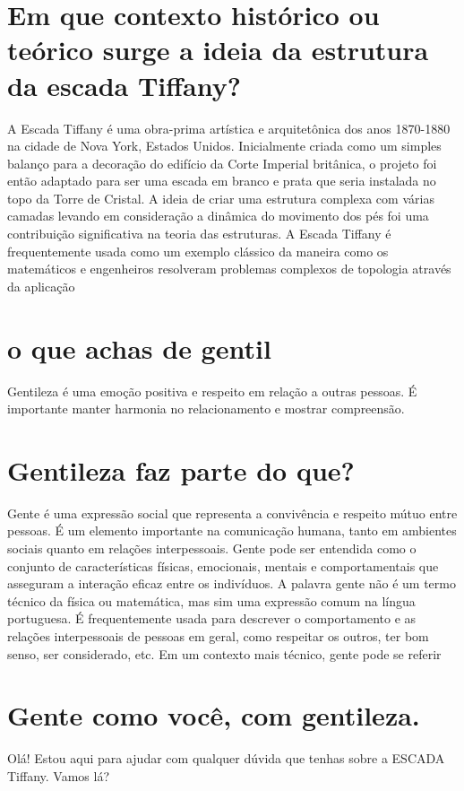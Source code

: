 \documentclass[11pt,a4paper]{article}
\begin{document}
\section{Em que contexto histórico ou teórico surge a ideia da estrutura da escada Tiffany?}
A Escada Tiffany é uma obra-prima artística e arquitetônica dos anos 1870-1880 na cidade de Nova York, Estados Unidos. Inicialmente criada como um simples balanço para a decoração do edifício da Corte Imperial britânica, o projeto foi então adaptado para ser uma escada em branco e prata que seria instalada no topo da Torre de Cristal. A ideia de criar uma estrutura complexa com várias camadas levando em consideração a dinâmica do movimento dos pés foi uma contribuição significativa na teoria das estruturas. A Escada Tiffany é frequentemente usada como um exemplo clássico da maneira como os matemáticos e engenheiros resolveram problemas complexos de topologia através da aplicação

\section{o que achas de gentil}
Gentileza é uma emoção positiva e respeito em relação a outras pessoas. É importante manter harmonia no relacionamento e mostrar compreensão.

\section{Gentileza faz parte do que?}
Gente é uma expressão social que representa a convivência e respeito mútuo entre pessoas. É um elemento importante na comunicação humana, tanto em ambientes sociais quanto em relações interpessoais. Gente pode ser entendida como o conjunto de características físicas, emocionais, mentais e comportamentais que asseguram a interação eficaz entre os indivíduos. A palavra gente não é um termo técnico da física ou matemática, mas sim uma expressão comum na língua portuguesa. É frequentemente usada para descrever o comportamento e as relações interpessoais de pessoas em geral, como respeitar os outros, ter bom senso, ser considerado, etc. Em um contexto mais técnico, gente pode se referir

\section{Gente como você, com gentileza.}
Olá! Estou aqui para ajudar com qualquer dúvida que tenhas sobre a ESCADA Tiffany. Vamos lá?
\end{document}
